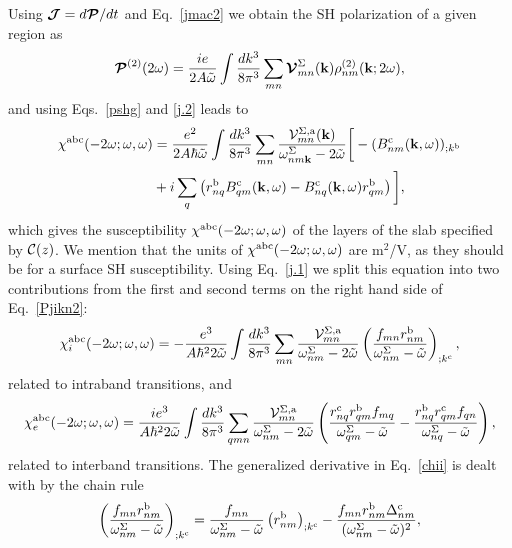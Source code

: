 \documentclass[floatfix,prb,aps,superscriptaddress,showpacs,11pt,preprint,letterpaper]{revtex4}
\begin{document}
Using
$\boldsymbol{\mathcal{\cal J}}=d\boldsymbol{\mathcal{\cal P}}/dt$ 
and Eq.~\eqref{jmac2} 
we obtain the SH polarization of a given region as
\begin{equation}\label{Pjikn}
\boldsymbol{\mathcal{\cal P}}^{(2)}(2\omega)
=\frac{ie}{2A\tilde\omega}
\int \frac{dk^3}{8\pi^3}
\sum_{mn}
\boldsymbol{\mathcal{\cal V}}^{\Sigma}_{mn}(\mathbf{k})
\rho^{(2)}_{nm}(\mathbf{k};2\omega)
,
\end{equation}
and using Eqs.~\eqref{pshg} and \eqref{j.2} 
leads to
\begin{align}\label{Pjikn2}
\chi^{\mathrm{a}\mathrm{b}\mathrm{c}}(-2\omega;\omega,\omega) 
&=
\frac{e^2}{2A\hbar\tilde\omega}
\int \frac{dk^3}{8\pi^3}
\sum_{mn}
\frac{{\mathbf{\cal V}}^{\Sigma,\mathrm{a}}_{mn}(\mathbf{k})}
{\omega^\Sigma_{nm\mathbf{k}}-2\tilde\omega}
\bigg[
-(B_{nm}^{\mathrm{c}}(\mathbf{k},\omega))_{;k^{\mathrm{b}}}
\nonumber \\
&
+i\sum_q\left(r_{nq}^{\mathrm{b}}B_{qm}^{\mathrm{c}}(\mathbf{k},\omega) -
  B_{nq}^{\mathrm{c}}(\mathbf{k},\omega) 
  r_{qm}^{\mathrm{b}}\right)
\bigg]
,
\end{align}
which gives the susceptibility 
$\chi^{\mathrm{a}\mathrm{b}\mathrm{c}}(-2\omega;\omega,\omega)$ 
of the layers of the slab specified by ${\mathbf{\cal C}}(z)$. 
We mention that the units of 
$\chi^{\mathrm{a}\mathrm{b}\mathrm{c}}(-2\omega;\omega,\omega)$
are m$^2$/V, as they should be for a surface SH susceptibility.
Using Eq.~\eqref{j.1} we
split this equation into
two contributions from the first and second terms on the right hand side
of Eq.~\eqref{Pjikn2}:
\begin{equation}\label{chii}
\chi^{\mathrm{a}\mathrm{b}\mathrm{c}}_i (-2\omega;\omega,\omega)
=-\frac{e^3}{A\hbar^22\tilde\omega}
\int \frac{dk^3}{8\pi^3}
\sum_{mn}
\frac{{\mathbf{\cal V}}_{mn}^{\Sigma,\mathrm{a}}}{\omega^\Sigma_{nm}-2\tilde\omega}
\left(\frac{f_{mn}r_{nm}^{\mathrm{b}}}{\omega^\Sigma_{nm}-\tilde\omega}\right)_{;k^{\mathrm{c}}}
,
\end{equation} 
related to intraband transitions, and 
\begin{equation}\label{chie}
\chi^{\mathrm{a}\mathrm{b}\mathrm{c}}_e (-2\omega;\omega,\omega)
=\frac{ie^3}{A\hbar^22\tilde\omega}
\int \frac{dk^3}{8\pi^3}
\sum_{qmn}
\frac{{\mathbf{\cal V}}_{mn}^{\Sigma,\mathrm{a}}}{\omega^\Sigma_{nm}-2\tilde\omega}
\left(
\frac{r_{nq}^{\mathrm{c}} r_{qm}^{\mathrm{b}} 
f_{mq}}{\omega^\Sigma_{qm}-\tilde\omega}
-\frac{r_{nq}^{\mathrm{b}} r_{qm}^{\mathrm{c}} 
f_{qn}}{\omega^\Sigma_{nq}-\tilde\omega}
\right),
\end{equation} 
related to interband transitions.
The generalized derivative in Eq.~\eqref{chii} is dealt with by the chain rule 
\begin{equation}\label{gene2}
\left(\frac{f_{mn}r_{nm}^{\mathrm{b}}}{\omega^\Sigma_{nm}-\tilde\omega}\right)_{;k^{\mathrm{c}}}=
\frac{f_{mn}}{\omega^\Sigma_{nm}-\tilde\omega}\left(r_{nm}^{\mathrm{b}}\right)_{;k^{\mathrm{c}}}
-\frac{f_{mn}r_{nm}^{\mathrm{b}}\Delta_{nm}^{\mathrm{c}}}{(\omega^\Sigma_{nm}-\tilde\omega)^2}
,
\end{equation}
\end{document}

